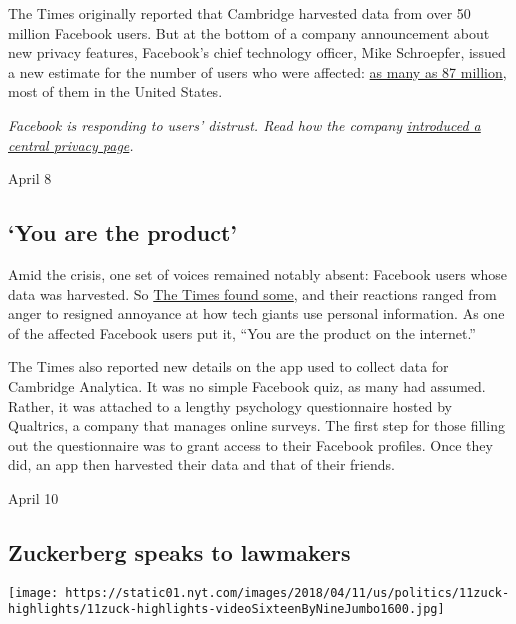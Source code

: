 The Times originally reported that Cambridge harvested data from over 50
million Facebook users. But at the bottom of a company announcement
about new privacy features, Facebook's chief technology officer, Mike
Schroepfer, issued a new estimate for the number of users who were
affected:
\href{https://www.nytimes.com/2018/04/04/technology/mark-zuckerberg-testify-congress.html}{as
many as 87 million}, most of them in the United States.

\emph{Facebook is responding to users' distrust. Read how the company}
\href{https://www.nytimes.com/2018/03/28/technology/facebook-privacy-security-settings.html}{\emph{introduced
a central privacy page}}\emph{. }

April 8

\hypertarget{you-are-the-product}{%
\subsection{`You are the product'}\label{you-are-the-product}}

Amid the crisis, one set of voices remained notably absent: Facebook
users whose data was harvested. So
\href{https://www.nytimes.com/2018/04/08/us/facebook-users-data-harvested-cambridge-analytica.html?rref=collection\%2Fbyline\%2Fmatthew-rosenberg\&action=click\&contentCollection=undefined\&region=stream\&module=stream_unit\&version=latest\&contentPlacement=1\&pgtype=collection}{The
Times found some}, and their reactions ranged from anger to resigned
annoyance at how tech giants use personal information. As one of the
affected Facebook users put it, ``You are the product on the internet.''

The Times also reported new details on the app used to collect data for
Cambridge Analytica. It was no simple Facebook quiz, as many had
assumed. Rather, it was attached to a lengthy psychology questionnaire
hosted by Qualtrics, a company that manages online surveys. The first
step for those filling out the questionnaire was to grant access to
their Facebook profiles. Once they did, an app then harvested their data
and that of their friends.

April 10

\hypertarget{zuckerberg-speaks-to-lawmakers}{%
\subsection{Zuckerberg speaks to
lawmakers}\label{zuckerberg-speaks-to-lawmakers}}

\texttt{[image: https://static01.nyt.com/images/2018/04/11/us/politics/11zuck-highlights/11zuck-highlights-videoSixteenByNineJumbo1600.jpg]}

